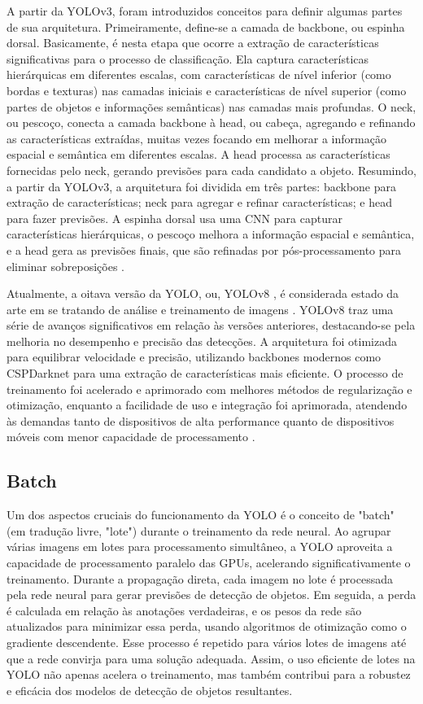 A partir da YOLOv3, foram introduzidos conceitos para definir algumas partes de sua arquitetura. Primeiramente, define-se a camada de backbone, ou espinha dorsal. Basicamente, é nesta etapa que ocorre a extração de características significativas para o processo de classificação. Ela captura características hierárquicas em diferentes escalas, com características de nível inferior (como bordas e texturas) nas camadas iniciais e características de nível superior (como partes de objetos e informações semânticas) nas camadas mais profundas. O neck, ou pescoço, conecta a camada backbone à head, ou cabeça, agregando e refinando as características extraídas, muitas vezes focando em melhorar a informação espacial e semântica em diferentes escalas. A head processa as características fornecidas pelo neck, gerando previsões para cada candidato a objeto. Resumindo, a partir da YOLOv3, a arquitetura foi dividida em três partes: backbone para extração de características; neck para agregar e refinar características; e head para fazer previsões. A espinha dorsal usa uma CNN para capturar características hierárquicas, o pescoço melhora a informação espacial e semântica, e a head gera as previsões finais, que são refinadas por pós-processamento para eliminar sobreposições \cite{terven2023comprehensive}.

Atualmente, a oitava versão da YOLO, ou, YOLOv8 , é considerada estado da arte em se tratando de análise e treinamento de imagens \cite{ultralytics2024}. YOLOv8 traz uma série de avanços significativos em relação às versões anteriores, destacando-se pela melhoria no desempenho e precisão das detecções. A arquitetura foi otimizada para equilibrar velocidade e precisão, utilizando backbones modernos como CSPDarknet para uma extração de características mais eficiente. O processo de treinamento foi acelerado e aprimorado com melhores métodos de regularização e otimização, enquanto a facilidade de uso e integração foi aprimorada, atendendo às demandas tanto de dispositivos de alta performance quanto de dispositivos móveis com menor capacidade de processamento \cite{hussain2023yolo}.


\subsection{Batch}
\label{sec:batch}

Um dos aspectos cruciais do funcionamento da YOLO é o conceito de "batch" (em tradução livre, "lote") durante o treinamento da rede neural. Ao agrupar várias imagens em lotes para processamento simultâneo, a YOLO aproveita a capacidade de processamento paralelo das GPUs, acelerando significativamente o treinamento. Durante a propagação direta, cada imagem no lote é processada pela rede neural para gerar previsões de detecção de objetos. Em seguida, a perda é calculada em relação às anotações verdadeiras, e os pesos da rede são atualizados para minimizar essa perda, usando algoritmos de otimização como o gradiente descendente. Esse processo é repetido para vários lotes de imagens até que a rede convirja para uma solução adequada. Assim, o uso eficiente de lotes na YOLO não apenas acelera o treinamento, mas também contribui para a robustez e eficácia dos modelos de detecção de objetos resultantes. \cite{goodfellow2016deep}

